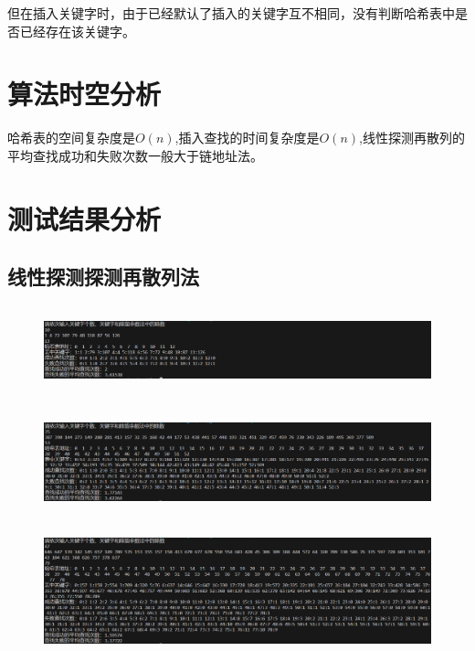 \documentclass{ctexart}
\begin{document}
	但在插入关键字时，由于已经默认了插入的关键字互不相同，没有判断哈希表中是否已经存在该关键字。
	\section{算法时空分析}
	哈希表的空间复杂度是$O(n)$,插入查找的时间复杂度是$O(n)$,线性探测再散列的平均查找成功和失败次数一般大于链地址法。
	\section{测试结果分析}
	\subsection{线性探测探测再散列法}
	\begin{figure}[H]
	\centering 
	\includegraphics[height=2.5cm,width=14cm]{1.png}
	\end{figure}
	\begin{figure}[H]
	\centering 
	\includegraphics[height=3cm,width=14cm]{2.png}
	\end{figure}
	\begin{figure}[H]
	\centering 
	\includegraphics[height=3.5cm,width=14cm]{3.png}
	\end{figure}
	
\end{document}
